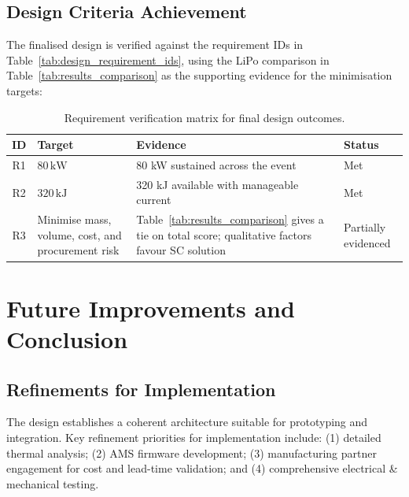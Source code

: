 \subsection{Design Criteria Achievement}
\label{sec:design_criteria_achievement}
The finalised design is verified against the requirement IDs in Table~\ref{tab:design_requirement_ids}, using the LiPo comparison in Table~\ref{tab:results_comparison} as the supporting evidence for the minimisation targets:

\begin{table}[htbp]
    \centering
    \caption{Requirement verification matrix for final design outcomes.}
    \label{tab:design_verification_matrix}
    \footnotesize
    \setlength{\tabcolsep}{4pt}
    \renewcommand{\arraystretch}{0.95}
    \begin{tabular}{|c|p{5cm}|p{7.5cm}|p{2cm}|}
        \hline
        \textbf{ID} & \textbf{Target} & \textbf{Evidence} & \textbf{Status} \\
        \hline
        R1 & $80\,\text{kW}$ & 80 kW sustained across the event & Met \\
        R2 & $320\,\text{kJ}$ & 320 kJ available with manageable current & Met \\
        R3 & Minimise mass, volume, cost, and procurement risk & Table~\ref{tab:results_comparison} gives a tie on total score; qualitative factors favour SC solution & Partially evidenced \\
        \hline
    \end{tabular}
\end{table}


\section{Future Improvements and Conclusion}

\subsection{Refinements for Implementation}
The design establishes a coherent architecture suitable for prototyping and integration. Key refinement priorities for implementation include: (1) detailed thermal analysis; (2) AMS firmware development; (3) manufacturing partner engagement for cost and lead-time validation; and (4) comprehensive electrical \& mechanical testing.

